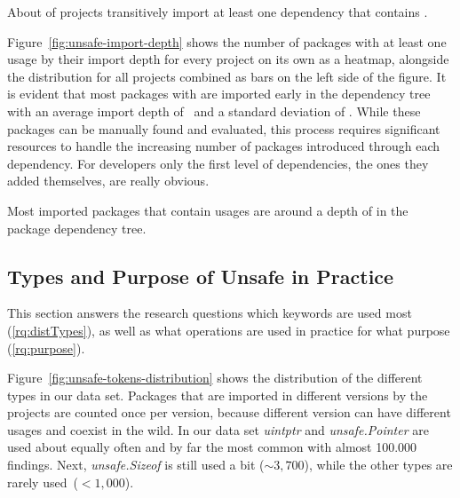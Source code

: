 \begin{tcolorbox}[boxsep=1pt, enlarge top by=5pt, title=Answer to \ref{rq:prevalDeps}]
About  of projects transitively import at least one dependency that contains \unsafe{}.
\end{tcolorbox}

Figure~\ref{fig:unsafe-import-depth} shows the number of packages with at least one \unsafe{} usage by their import depth for every project on its own as a heatmap, alongside the distribution for all projects combined as bars on the left side of the figure.
It is evident that most packages with \unsafe{} are imported early in the dependency tree with an average import depth of \averageUnsafeImportDepth~and a standard deviation of \stdUnsafeImportDepth.
While these packages can be manually found and evaluated, this process requires significant resources to handle the increasing number of packages introduced through each dependency. 
For developers only the first level of dependencies, the ones they added themselves, are really obvious.

\begin{tcolorbox}[boxsep=1pt, enlarge top by=5pt, title=Answer to \ref{rq:depsDepth}]
Most imported packages that contain \unsafe{} usages are around a depth of  in the package dependency tree.
\end{tcolorbox}


\subsection{Types and Purpose of Unsafe in Practice}

This section answers the research questions which \unsafe{} keywords are used most (\ref{rq:distTypes}), as well as what \unsafe{} operations are used in practice for what purpose (\ref{rq:purpose}).

Figure~\ref{fig:unsafe-tokens-distribution} shows the distribution of the different \unsafe{} types in our data set.
Packages that are imported in different versions by the projects are counted once per version, because different version can have different \unsafe{} usages and coexist in the wild.
In our data set \textit{uintptr} and \textit{unsafe.Pointer} are used about equally often and by far the most common with almost 100.000 findings. 
Next, \textit{unsafe.Sizeof} is still used a bit ($\sim 3,700$), while the other \unsafe{} types are rarely used~($< 1,000$).

